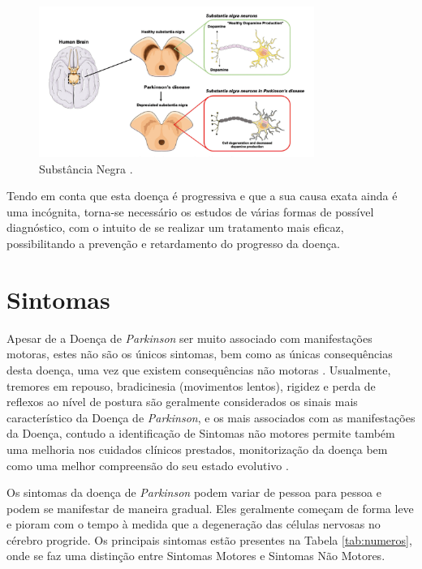 \documentclass[12pt,a4paper,twoside]{report}
\begin{document}
{\begin{figure}[H]
    \centering
    \includegraphics[width=0.8\textwidth]{imagens/Substância Negra.png}
    \caption{Substância Negra \cite{Dopamina}.}
    \label{fig:Substância Negra}
\end{figure}

Tendo em conta que esta doença é progressiva e que a sua causa exata ainda é uma incógnita, torna-se necessário os estudos de várias formas de possível diagnóstico, com o intuito de se realizar um tratamento mais eficaz, possibilitando a prevenção e retardamento do progresso da doença.

\section{Sintomas}

Apesar de a Doença de \textit{Parkinson} ser muito associado com manifestações motoras, estes não são os únicos sintomas, bem como as únicas consequências desta doença, uma vez que existem consequências não motoras \cite{Jankovic368}. Usualmente, tremores em repouso, bradicinesia (movimentos lentos), rigidez e perda de reflexos ao nível de postura são geralmente considerados os sinais mais característico da Doença de \textit{Parkinson}, e os mais associados com as manifestações da Doença, contudo a identificação de Sintomas não motores permite também uma melhoria nos cuidados clínicos prestados, monitorização da doença bem como uma melhor compreensão do seu estado evolutivo \cite{Cabreira_Massano_2019}.

Os sintomas da doença de \textit{Parkinson} podem variar de pessoa para pessoa e podem se manifestar de maneira gradual. Eles geralmente começam de forma leve e pioram com o tempo à medida que a degeneração das células nervosas no cérebro progride. Os principais sintomas estão presentes na Tabela \ref{tab:numeros}, onde se faz uma distinção entre Sintomas Motores e Sintomas Não Motores.

}
\end{document}
